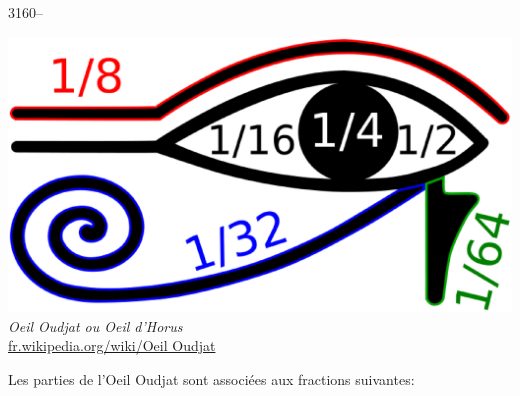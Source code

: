 \documentclass[letterpaper, 12pt]{article}
\begin{document}
3160--
\begin{center}
\includegraphics[scale=0.15]{oeildHorus.eps}\\
\emph{{\small Oeil Oudjat ou Oeil d'Horus}}\\
\href{http://fr.wikipedia.org/wiki/\%C5\%92il_Oudjat}{fr.wikipedia.org/wiki/Oeil Oudjat}\\
\end{center}
Les parties de l'Oeil Oudjat sont associ\'ees aux fractions suivantes:
\end{document}
